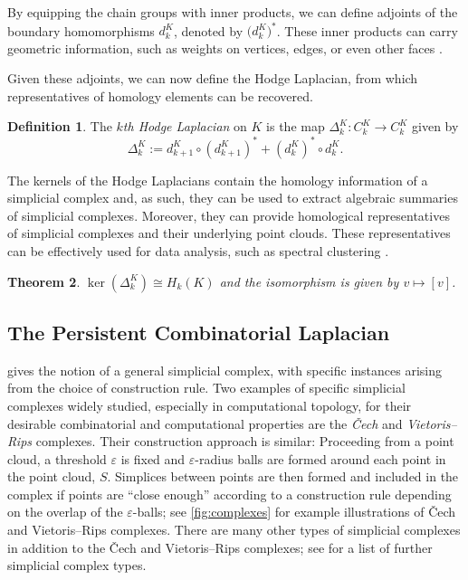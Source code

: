 \documentclass[11pt]{article}
\newtheorem{theorem}{Theorem}[section]
\theoremstyle{definition}
\newtheorem{definition}[theorem]{Definition}
\theoremstyle{remark}
\begin{document}
By equipping the chain groups with inner products, we can define adjoints of the boundary homomorphisms $d^K_k$, denoted by $\big(d^K_k \big)^*$. These inner products can carry geometric information, such as weights on vertices, edges, or even other faces \citep[p.~5]{mww}.

Given these adjoints, we can now define the Hodge Laplacian, from which representatives of homology elements can be recovered.

\begin{definition}\textnormal{\citep[Hodge Laplacian,][Definition 2.1]{josthorak}}
    The \emph{$k$th Hodge Laplacian} on $K$ is the map $\Delta^K_k: C^K_k \to C^K_k$ given by
    \[
    \Delta^K_k := d^K_{k+1} \circ \left(d^K_{k+1}\right)^* + \left(d^K_{k}\right)^* \circ d^K_{k}.
    \]
\end{definition}

The kernels of the Hodge Laplacians contain the homology information of a simplicial complex and, as such, they can be used to extract algebraic summaries of simplicial complexes. Moreover, they can provide homological representatives of simplicial complexes and their underlying point clouds. These representatives can be effectively used for data analysis, such as spectral clustering \citep{spec_clust}.

\begin{theorem}\textnormal{\citep[Combinatorial Hodge Theorem,][Theorem 5.3]{lim}} \label{thm:comb_ker}
    $\ker(\Delta^K_k) \cong H_k(K)$ and the isomorphism is given by $v \mapsto [v]$.
\end{theorem}

\subsection{The Persistent Combinatorial Laplacian} \label{sec:persmot}

 gives the notion of a general simplicial complex, with specific instances arising from the choice of construction rule. Two examples of specific simplicial complexes widely studied, especially in computational topology, for their desirable combinatorial and computational properties are the \emph{\v{C}ech} and \emph{Vietoris--Rips} complexes.  Their construction approach is similar: Proceeding from a point cloud, a threshold $\varepsilon$ is fixed and $\varepsilon$-radius balls are formed around each point in the point cloud, $S$. Simplices between points are then formed and included in the complex if points are ``close enough'' according to a construction rule depending on the overlap of the $\varepsilon$-balls; see \cref{fig:complexes} for example illustrations of \v{C}ech and Vietoris--Rips complexes.  There are many other types of simplicial complexes in addition to the \v{C}ech and Vietoris--Rips complexes; see \citet[pp.~27-33]{sctypes} for a list of further simplicial complex types.
\end{document}
